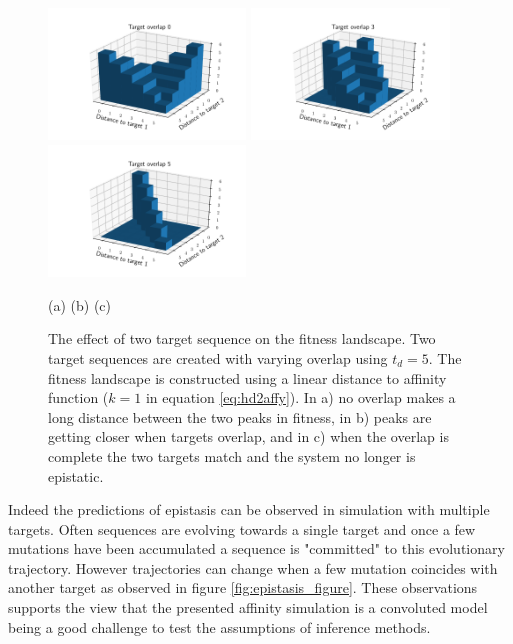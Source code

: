 \begin{figure}[!ht]
\begin{center} 
\includegraphics[height=35mm]{figures/fitness_overlap0.pdf}
\includegraphics[height=35mm]{figures/fitness_overlap3.pdf}
\includegraphics[height=35mm]{figures/fitness_overlap5.pdf} \newline%
\end{center}
\vspace{-6mm} \hspace{26mm} (a) \hspace{39mm} (b) \hspace{39mm} (c)
    \caption{
    \label{fig:epistasis}
        The effect of two target sequence on the fitness landscape.
        Two target sequences are created with varying overlap using $t_d=5$.
        The fitness landscape is constructed using a linear distance to affinity function ($k=1$ in equation \ref{eq:hd2affy}).
        In a) no overlap makes a long distance between the two peaks in fitness, in b) peaks are getting closer when targets overlap, and in c) when the overlap is complete the two targets match and the system no longer is epistatic.
        }
\end{figure}


Indeed the predictions of epistasis can be observed in simulation with multiple targets.
Often sequences are evolving towards a single target and once a few mutations have been accumulated a sequence is "committed" to this evolutionary trajectory.
However trajectories can change when a few mutation coincides with another target as observed in figure \ref{fig:epistasis_figure}.
These observations supports the view that the presented affinity simulation is a convoluted model being a good challenge to test the assumptions of inference methods.

